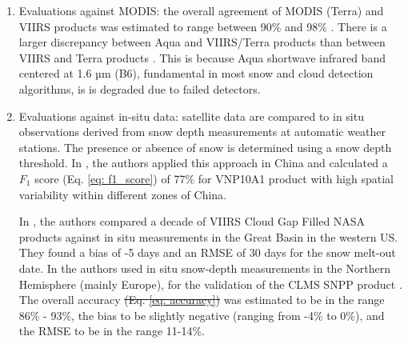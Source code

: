 \documentclass[tc, manuscript]{copernicus}
\providecommand{\DIFdeltex}[1]{{\protect\color{red}\sout{#1}}}                      %
\providecommand{\DIFdelbegin}{} %
\providecommand{\DIFdelend}{} %
\providecommand{\DIFdel}[1]{\texorpdfstring{\DIFdeltex{#1}}{}} %
\begin{document}
\begin{enumerate}

    \item Evaluations against MODIS: the overall agreement of MODIS (Terra) and VIIRS products was estimated to range between 90\% and 98\% \citep{riggs2023viirs, thapa_cross-comparison_2019}. There is a larger discrepancy between Aqua and VIIRS/Terra products than between VIIRS and Terra products \citep{zhang_comparative_2020}. This is because Aqua shortwave infrared band centered at 1.6 µm (B6), fundamental in most snow and cloud detection algorithms, is is degraded due to failed detectors.

    \item Evaluations against in-situ data: satellite data are compared to in situ observations derived from snow depth measurements at automatic weather stations. The presence or absence of snow is determined using a snow depth threshold. In \citep{zhang_comparative_2020}, the authors applied this approach in China and calculated a $F_1$ score (Eq. \ref{eq: f1_score}) of 77\% for VNP10A1 product with high spatial variability within different zones of China.

    In \citep{hall_comparison_2024}, the authors compared a decade of VIIRS Cloud Gap Filled NASA products against in situ measurements in the Great Basin in the western US. They found a bias of -5 days and an RMSE of 30 days for the snow melt-out date. In \citep{schwaizer2020SnowCoverExtentb} the authors used in situ snow-depth measurements in the Northern Hemisphere (mainly Europe), for the validation of the CLMS SNPP product \citep{europeanunionscopernicuslandmonitoringserviceinformationSnowCoverExtent}. 
    The overall accuracy \DIFdelbegin \DIFdel{(Eq. \ref{eq: accuracy}) }\DIFdelend was estimated to be in the range 86\% - 93\%, the bias to be slightly negative (ranging from -4\% to 0\%), and the RMSE to be in the range 11-14\%.


\end{enumerate}
\end{document}
